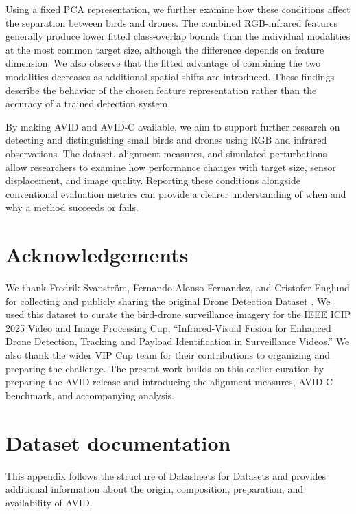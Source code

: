 \documentclass[10pt]{article}
\newcommand{\dataset}{\textsc{AVID}}
\newcommand{\corrupt}{\textsc{AVID-C}}
\begin{document}
Using a fixed PCA representation, we further examine how these conditions affect the separation between birds and drones. The combined RGB-infrared features generally produce lower fitted class-overlap bounds than the individual modalities at the most common target size, although the difference depends on feature dimension. We also observe that the fitted advantage of combining the two modalities decreases as additional spatial shifts are introduced. These findings describe the behavior of the chosen feature representation rather than the accuracy of a trained detection system.

By making \dataset{} and \corrupt{} available, we aim to support further research on detecting and distinguishing small birds and drones using RGB and infrared observations. The dataset, alignment measures, and simulated perturbations allow researchers to examine how performance changes with target size, sensor displacement, and image quality. Reporting these conditions alongside conventional evaluation metrics can provide a clearer understanding of when and why a method succeeds or fails.


\section*{Acknowledgements}

We thank Fredrik Svanstr\"om, Fernando Alonso-Fernandez, and Cristofer Englund for collecting and publicly sharing the original Drone Detection Dataset \citep{svanstrom2021multisensor}. We used this dataset to curate the bird-drone surveillance imagery for the IEEE ICIP 2025 Video and Image Processing Cup, ``Infrared-Visual Fusion for Enhanced Drone Detection, Tracking and Payload Identification in Surveillance Videos.'' We also thank the wider VIP Cup team for their contributions to organizing and preparing the challenge. The present work builds on this earlier curation by preparing the \dataset{} release and introducing the alignment measures, \corrupt{} benchmark, and accompanying analysis.




\clearpage
\appendix


\section{Dataset documentation}
\label{app:datasheet}

This appendix follows the structure of Datasheets for Datasets \citep{gebru2021datasheets} and provides additional information about the origin, composition, preparation, and availability of \dataset{}.
\end{document}
